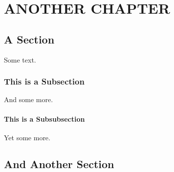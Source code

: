 \chapter{ANOTHER CHAPTER}\label{anotherchapter}


\section{A Section}
Some text.
\subsection{This is a Subsection}
And some more.
\subsubsection{This is a Subsubsection}
Yet some more.

\section{And Another Section}


\endinput